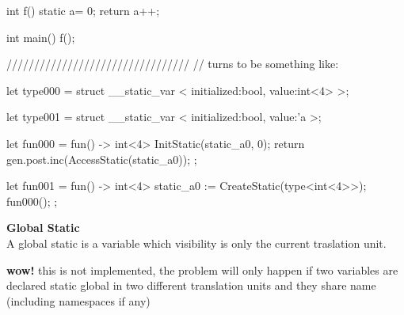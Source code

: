 \begin{srcCode}

	int f(){
		static a= 0;
		return a++;
	}

	int main(){
		f();
	}

/////////////////////////////////
// turns to be something like:

	let type000 = struct __static_var <
		initialized:bool,
		value:int<4>
	>;

	let type001 = struct __static_var <
		initialized:bool,
		value:'a
	>;

	let fun000 = fun() -> int<4> {
		InitStatic(static_a0, 0);
		return gen.post.inc(AccessStatic(static_a0));
	};

	let fun001 = fun() -> int<4> {
		static_a0 := CreateStatic(type<int<4>>);
		fun000();
	};

\end{srcCode}

\textbf{Global Static}\\

	A global static is a variable which visibility is only the current traslation unit.

	\textbf{wow!} this is not implemented, the problem will only happen if two variables are declared static
	global in two different translation units and they share name (including namespaces if any)

	





